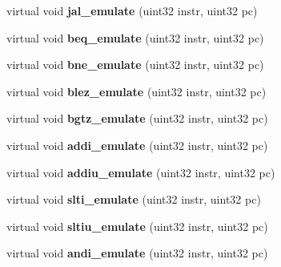 \begin{DoxyCompactItemize}
\item 
\hypertarget{classCPU_aa65d0dc6f6e345d632d962cda7415ffc}{
virtual void {\bfseries jal\_\-emulate} (uint32 instr, uint32 pc)}
\label{classCPU_aa65d0dc6f6e345d632d962cda7415ffc}

\item 
\hypertarget{classCPU_ab8483602543bb291a6bcab1873226e6d}{
virtual void {\bfseries beq\_\-emulate} (uint32 instr, uint32 pc)}
\label{classCPU_ab8483602543bb291a6bcab1873226e6d}

\item 
\hypertarget{classCPU_ae1bbc7bdc294a982307db5dd92f3f29a}{
virtual void {\bfseries bne\_\-emulate} (uint32 instr, uint32 pc)}
\label{classCPU_ae1bbc7bdc294a982307db5dd92f3f29a}

\item 
\hypertarget{classCPU_a07d85530f9f0e3cd63d4e38e770c37df}{
virtual void {\bfseries blez\_\-emulate} (uint32 instr, uint32 pc)}
\label{classCPU_a07d85530f9f0e3cd63d4e38e770c37df}

\item 
\hypertarget{classCPU_ad099b433c0dd31578883fb7aab329c21}{
virtual void {\bfseries bgtz\_\-emulate} (uint32 instr, uint32 pc)}
\label{classCPU_ad099b433c0dd31578883fb7aab329c21}

\item 
\hypertarget{classCPU_ac59325c43ac5db28acdd841fc4755cc2}{
virtual void {\bfseries addi\_\-emulate} (uint32 instr, uint32 pc)}
\label{classCPU_ac59325c43ac5db28acdd841fc4755cc2}

\item 
\hypertarget{classCPU_adcf694d210e2340a1dcba7e1b1d8f147}{
virtual void {\bfseries addiu\_\-emulate} (uint32 instr, uint32 pc)}
\label{classCPU_adcf694d210e2340a1dcba7e1b1d8f147}

\item 
\hypertarget{classCPU_a6e6b0514f1ae4b8a92c5356bda7b6edc}{
virtual void {\bfseries slti\_\-emulate} (uint32 instr, uint32 pc)}
\label{classCPU_a6e6b0514f1ae4b8a92c5356bda7b6edc}

\item 
\hypertarget{classCPU_a7720b01681dae29df475f52a88d687d9}{
virtual void {\bfseries sltiu\_\-emulate} (uint32 instr, uint32 pc)}
\label{classCPU_a7720b01681dae29df475f52a88d687d9}

\item 
\hypertarget{classCPU_a428a65c6ca86430e3d5c34bae25aec4d}{
virtual void {\bfseries andi\_\-emulate} (uint32 instr, uint32 pc)}
\label{classCPU_a428a65c6ca86430e3d5c34bae25aec4d}


\end{DoxyCompactItemize}
